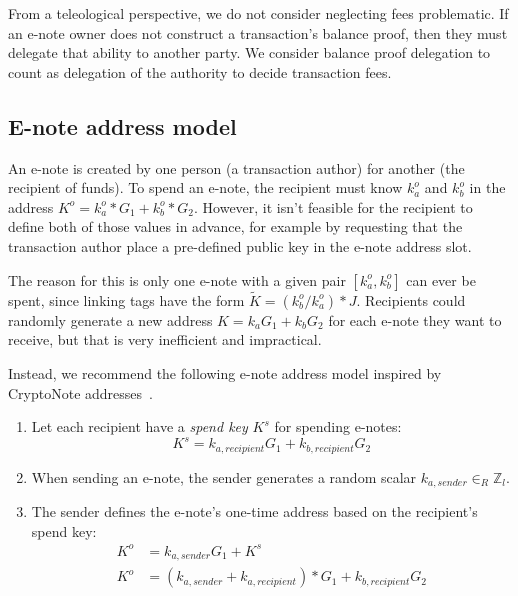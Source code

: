 From a teleological perspective, we do not consider neglecting fees problematic. If an e-note owner does not construct a transaction's balance proof, then they must delegate that ability to another party. We consider balance proof delegation to count as delegation of the authority to decide transaction fees.


\subsection{E-note address model}
\label{subsec:seraphis-address-model}

An e-note is created by one person (a transaction author) for another (the recipient of funds). To spend an e-note, the recipient must know $k^o_a$ and $k^o_b$ in the address $K^o = k^o_a*G_1 + k^o_b*G_2$. However, it isn't feasible for the recipient to define both of those values in advance, for example by requesting that the transaction author place a pre-defined public key in the e-note address slot.

The reason for this is only one e-note with a given pair $[k^o_a, k^o_b]$ can ever be spent, since linking tags have the form $\tilde{K} = (k^o_b/k^o_a)*J$. Recipients could randomly generate a new address $K = k_a G_1 + k_b G_2$ for each e-note they want to receive, but that is very inefficient and impractical.

Instead, we recommend the following e-note address model inspired by CryptoNote addresses~\cite{cryptoNoteWhitePaper}.

\begin{enumerate}
    \item Let each recipient have a {\em spend key} $K^s$ for spending e-notes:\vspace{.115cm}
    \[K^s = k_{a, recipient} G_1 + k_{b, recipient} G_2\]

    \item When sending an e-note, the sender generates a random scalar $k_{a, sender} \in_R \mathbb{Z}_l$.

    \item The sender defines the e-note's one-time address based on the recipient's spend key:\vspace{.115cm}
    \begin{align*}
        K^o &= k_{a, sender} G_1 + K^s \\
        K^o &= (k_{a, sender} + k_{a, recipient})*G_1 + k_{b, recipient} G_2
    \end{align*}
\end{enumerate}

